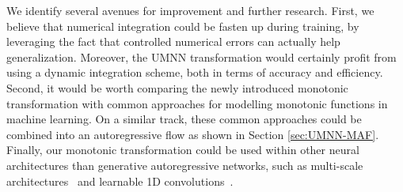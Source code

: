 We identify several avenues for improvement and further research.
First, we believe that numerical integration could be fasten up during training, by leveraging the fact that controlled numerical errors can actually help generalization. Moreover, the UMNN transformation would certainly profit from using a dynamic integration scheme, both in terms of accuracy and efficiency.
Second, it would be worth comparing the newly introduced monotonic transformation with common approaches for modelling monotonic functions in machine learning. On a similar track, these common approaches could be combined into an autoregressive flow as shown in Section \ref{sec:UMNN-MAF}.
Finally, our monotonic transformation could be used within other neural architectures than generative autoregressive networks, such as multi-scale architectures~\citep{dinh_density_2017} and learnable 1D convolutions~\citep{kingma_glow_2018}.
